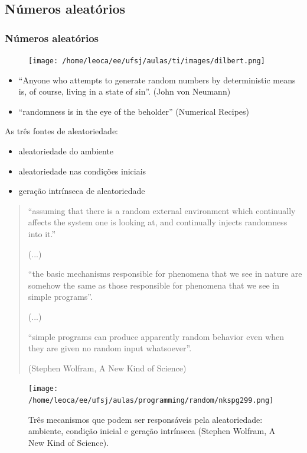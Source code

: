 \subsection{Números aleatórios}
\begin{frame}
  \frametitle{Números aleatórios}

        \begin{figure}[h!]
        \centering
        \texttt{[image: /home/leoca/ee/ufsj/aulas/ti/images/dilbert.png]}
        \label{fig:dilbert-random}
        \end{figure}

  \begin{itemize}
  \item ``Anyone who attempts to generate random numbers by deterministic means is,
          of course, living in a state of sin''. (John von Neumann)
  \item ``randomness is in the eye of the beholder'' (Numerical Recipes)
  \end{itemize}

  As três fontes de aleatoriedade:
  \begin{itemize}
  \item aleatoriedade do ambiente
  \item aleatoriedade nas condições iniciais
  \item geração intrínseca de aleatoriedade
  \end{itemize}

  \begin{quote}
  ``assuming that there is a random external environment which
    continually affects the system one is looking at, and continually
    injects randomness into it.''

    (...)

  ``the basic mechanisms responsible for phenomena that we see in nature are
    somehow the same as those responsible for phenomena that we see
    in simple programs''.

    (...)

  ``simple programs can produce apparently random behavior even when they are given no random input whatsoever''.

  (Stephen Wolfram, A New Kind of Science)
  \end{quote}

  \begin{figure}[h!]
  \centering
  \texttt{[image: /home/leoca/ee/ufsj/aulas/programming/random/nkspg299.png]}
  \caption{Três mecanismos que podem ser responsáveis pela aleatoriedade: ambiente, condição inicial e
          geração intrínseca (Stephen Wolfram, A New Kind of Science).}
  \label{fig:nkspg299}
  \end{figure}


\end{frame}
